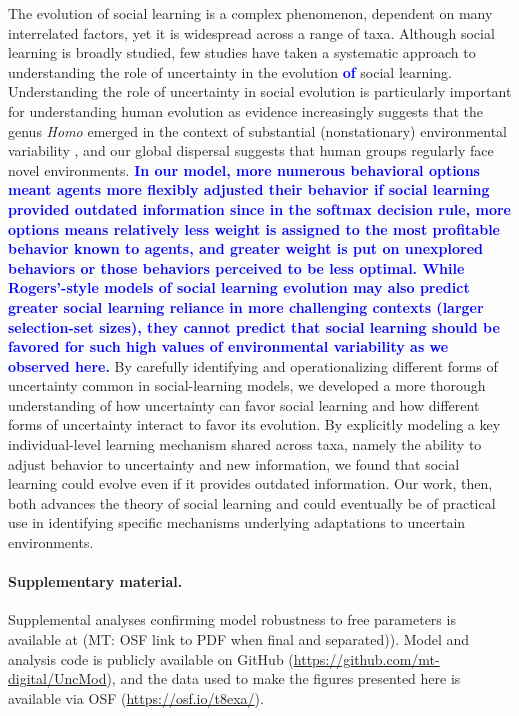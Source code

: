 \documentclass[letterpaper,11.5pt]{scrartcl}
\newcommand{\mt}[1]{{\textcolor{myorange} {({\tiny MT:} #1)}}}
\newcommand{\edit}[1]{{\bfseries \textcolor{blue} {#1}}}
\begin{document}
The evolution of social learning is a complex phenomenon, dependent on many interrelated factors, yet it is widespread across a
range of taxa. Although social learning is broadly studied, few studies have taken a systematic approach to understanding the role
of uncertainty in the evolution \edit{of} social learning. Understanding the role of uncertainty in social evolution is particularly important
for understanding human evolution as evidence increasingly suggests that the genus \emph{Homo} emerged in the context of substantial
(nonstationary) environmental variability \citep{anton_etal2014, levin2015}, and our global dispersal
suggests that human groups regularly face novel environments. \edit{In our model, more numerous behavioral options meant agents more flexibly adjusted their behavior if social learning provided outdated information since in the softmax decision rule, more options means relatively less weight is assigned to the most profitable behavior known to agents, and greater weight is put on unexplored behaviors or those behaviors perceived to be less optimal. While Rogers'-style models of social learning evolution may also predict greater social learning reliance in more challenging contexts (larger selection-set sizes), they cannot predict that social learning should be favored for such high values of
environmental variability as we observed here.} 
By carefully identifying and operationalizing different forms of uncertainty common in social-learning models, we developed a more thorough understanding of how uncertainty can favor social learning and how different forms of uncertainty interact to favor its evolution. By explicitly modeling a key individual-level learning mechanism shared across taxa, namely the ability to adjust behavior to uncertainty and new information, we found that social learning could evolve even if it provides outdated information. %
Our work, then, both advances the theory of social learning and could eventually be of practical use in identifying specific mechanisms underlying adaptations to uncertain environments.


\paragraph{Supplementary material.} Supplemental analyses confirming model robustness to free parameters is available at \mt{OSF link to PDF when final and separated)}. Model and analysis code is publicly available on GitHub (\url{https://github.com/mt-digital/UncMod}), and the data used to make the figures presented here is available via OSF (\url{https://osf.io/t8exa/}).
\end{document}
